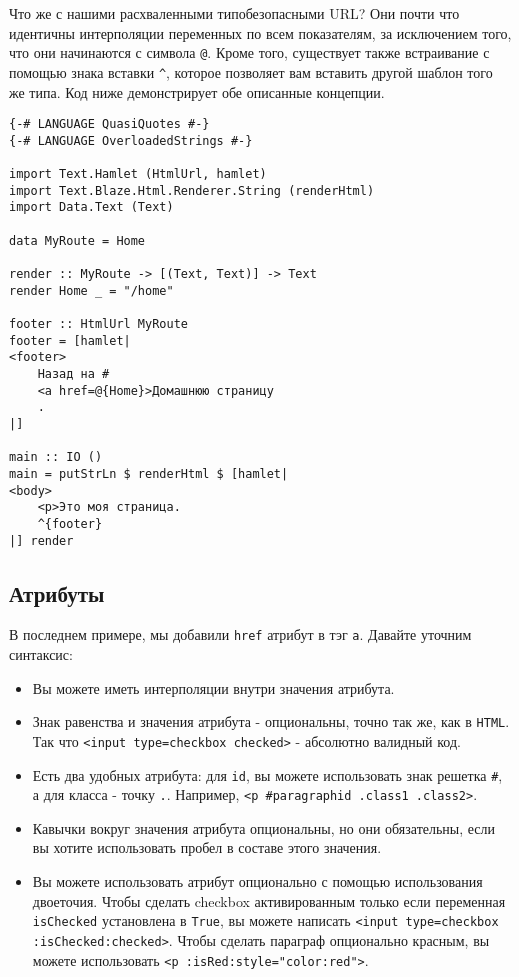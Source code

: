 Что же с нашими расхваленными типобезопасными URL? Они почти что идентичны
интерполяции переменных по всем показателям, за исключением того, что они
начинаются с символа \texttt{@}. Кроме того, существует также встраивание с помощью
знака вставки \verb'^', которое позволяет вам вставить другой шаблон того же типа.
Код ниже демонстрирует обе описанные концепции.

\begin{lstlisting}
{-# LANGUAGE QuasiQuotes #-}
{-# LANGUAGE OverloadedStrings #-}

import Text.Hamlet (HtmlUrl, hamlet)
import Text.Blaze.Html.Renderer.String (renderHtml)
import Data.Text (Text)

data MyRoute = Home

render :: MyRoute -> [(Text, Text)] -> Text
render Home _ = "/home"

footer :: HtmlUrl MyRoute
footer = [hamlet|
<footer>
    Назад на #
    <a href=@{Home}>Домашнюю страницу
    .
|]

main :: IO ()
main = putStrLn $ renderHtml $ [hamlet|
<body>
    <p>Это моя страница.
    ^{footer}
|] render
\end{lstlisting}

\subsection{Атрибуты}
В последнем примере, мы добавили \texttt{href} атрибут в тэг \texttt{a}. Давайте
уточним синтаксис:

\begin{itemize}
\item Вы можете иметь интерполяции внутри значения атрибута. 
\item Знак равенства и значения атрибута - опциональны, точно так же, как в \texttt{HTML}.
Так что \lstinline!<input type=checkbox checked>! - абсолютно валидный код.
\item Есть два удобных атрибута: для \lstinline!id!, вы можете использовать знак 
решетка \texttt{\#}, а для класса - точку \texttt{.}. Например, \lstinline!<p #paragraphid .class1 .class2>!.
\item Кавычки вокруг значения атрибута опциональны, но они обязательны, если вы
хотите использовать пробел в составе этого значения.
\item Вы можете использовать атрибут опционально с помощью использования двоеточия.
Чтобы сделать checkbox активированным только если переменная \lstinline!isChecked!
установлена в \lstinline!True!, вы можете написать
\lstinline!<input type=checkbox :isChecked:checked>!.
Чтобы сделать параграф опционально красным, вы можете использовать
\lstinline!<p :isRed:style="color:red">!.
\end{itemize}


